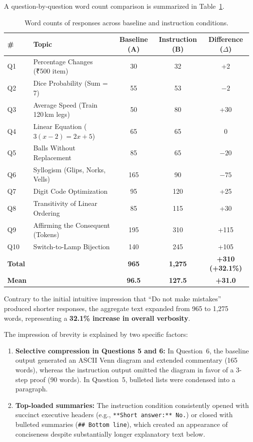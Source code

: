 \documentclass[11pt,a4paper]{article}
\begin{document}
A question-by-question word count comparison is summarized in Table~\ref{tab:wordcount}.

\begin{table}[h]
\centering
\begin{tabular}{llccc}
\toprule
\textbf{\#} & \textbf{Topic} & \textbf{Baseline (A)} & \textbf{Instruction (B)} & \textbf{Difference ($\Delta$)} \\
\midrule
Q1  & Percentage Changes (₹500 item)      & 30  & 32  & +2   \\
Q2  & Dice Probability (Sum = 7)          & 55  & 53  & $-2$  \\
Q3  & Average Speed (Train 120\,km legs)  & 50  & 80  & +30  \\
Q4  & Linear Equation ($3(x-2)=2x+5$)     & 65  & 65  & 0    \\
Q5  & Balls Without Replacement           & 85  & 65  & $-20$ \\
Q6  & Syllogism (Glips, Norks, Vells)     & 165 & 90  & $-75$ \\
Q7  & Digit Code Optimization             & 95  & 120 & +25  \\
Q8  & Transitivity of Linear Ordering     & 85  & 115 & +30  \\
Q9  & Affirming the Consequent (Tokens)   & 195 & 310 & +115 \\
Q10 & Switch-to-Lamp Bijection            & 140 & 245 & +105 \\
\midrule
\textbf{Total} & & \textbf{965} & \textbf{1,275} & \textbf{+310 (+32.1\%)} \\
\textbf{Mean}  & & \textbf{96.5} & \textbf{127.5} & \textbf{+31.0} \\
\bottomrule
\end{tabular}
\caption{Word counts of responses across baseline and instruction conditions.}
\label{tab:wordcount}
\end{table}

Contrary to the initial intuitive impression that ``Do not make mistakes'' produced shorter responses, the aggregate text expanded from 965 to 1,275 words, representing a \textbf{32.1\% increase in overall verbosity}.

The impression of brevity is explained by two specific factors:
\begin{enumerate}[leftmargin=*]
    \item \textbf{Selective compression in Questions 5 and 6:} In Question~6, the baseline output generated an ASCII Venn diagram and extended commentary (165 words), whereas the instruction output omitted the diagram in favor of a 3-step proof (90 words). In Question~5, bulleted lists were condensed into a paragraph.
    \item \textbf{Top-loaded summaries:} The instruction condition consistently opened with succinct executive headers (e.g., \texttt{**Short answer:** No.}) or closed with bulleted summaries (\texttt{\#\# Bottom line}), which created an appearance of conciseness despite substantially longer explanatory text below.
\end{enumerate}
\end{document}
